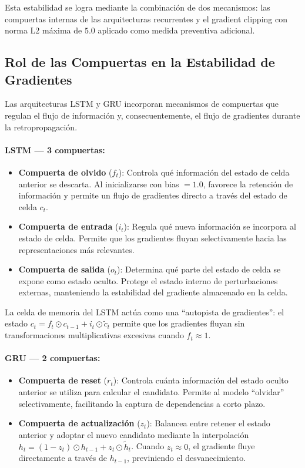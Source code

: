 Esta estabilidad se logra mediante la combinación de dos mecanismos: las compuertas
internas de las arquitecturas recurrentes y el gradient clipping con norma L2
máxima de $5.0$ aplicado como medida preventiva adicional.

\subsection{Rol de las Compuertas en la Estabilidad de Gradientes}

Las arquitecturas LSTM y GRU incorporan mecanismos de compuertas que regulan el
flujo de información y, consecuentemente, el flujo de gradientes durante la
retropropagación.

\paragraph{LSTM — 3 compuertas:}
\begin{itemize}
    \item \textbf{Compuerta de olvido} ($f_t$): Controla qué información del estado
    de celda anterior se descarta. Al inicializarse con bias $= 1.0$, favorece la
    retención de información y permite un flujo de gradientes directo a través del
    estado de celda $c_t$.
    \item \textbf{Compuerta de entrada} ($i_t$): Regula qué nueva información se
    incorpora al estado de celda. Permite que los gradientes fluyan selectivamente
    hacia las representaciones más relevantes.
    \item \textbf{Compuerta de salida} ($o_t$): Determina qué parte del estado de
    celda se expone como estado oculto. Protege el estado interno de perturbaciones
    externas, manteniendo la estabilidad del gradiente almacenado en la celda.
\end{itemize}

La celda de memoria del LSTM actúa como una ``autopista de gradientes'': el estado
$c_t = f_t \odot c_{t-1} + i_t \odot \tilde{c}_t$ permite que los gradientes
fluyan sin transformaciones multiplicativas excesivas cuando $f_t \approx 1$.

\paragraph{GRU — 2 compuertas:}
\begin{itemize}
    \item \textbf{Compuerta de reset} ($r_t$): Controla cuánta información del
    estado oculto anterior se utiliza para calcular el candidato. Permite al modelo
    ``olvidar'' selectivamente, facilitando la captura de dependencias a corto plazo.
    \item \textbf{Compuerta de actualización} ($z_t$): Balancea entre retener el
    estado anterior y adoptar el nuevo candidato mediante la interpolación
    $h_t = (1 - z_t) \odot h_{t-1} + z_t \odot \tilde{h}_t$. Cuando $z_t \approx 0$,
    el gradiente fluye directamente a través de $h_{t-1}$, previniendo el
    desvanecimiento.
\end{itemize}

